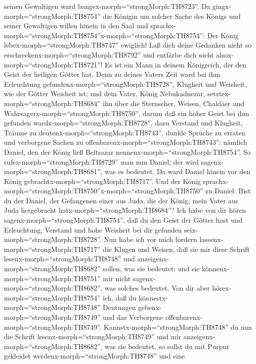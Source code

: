 seinen Gewaltigen ward bangex-morph=``strongMorph:TH8723''.
 Da gingx-morph=``strongMorph:TH8754'' die Königin um
solcher Sache des Königs und seiner Gewaltigen willen hinein in den Saal
und sprachx-morph=``strongMorph:TH8754''x-morph=``strongMorph:TH8754'':
Der König lebex-morph=``strongMorph:TH8747'' ewiglich! Laß dich deine
Gedanken nicht so erschreckenx-morph=``strongMorph:TH8792'' und entfärbe
dich nicht alsox-morph=``strongMorph:TH8721''!  Es ist ein
Mann in deinem Königreich, der den Geist der heiligen Götter hat. Denn
zu deines Vaters Zeit ward bei ihm Erleuchtung
gefundenx-morph=``strongMorph:TH8728'', Klugheit und Weisheit, wie der
Götter Weisheit ist; und dein Vater, König Nebukadnezar,
setztex-morph=``strongMorph:TH8684'' ihn über die Sternseher, Weisen,
Chaldäer und Wahrsagerx-morph=``strongMorph:TH8750'', 
darum daß ein hoher Geist bei ihm gefunden
wardx-morph=``strongMorph:TH8728'', dazu Verstand und Klugheit, Träume
zu deutenx-morph=``strongMorph:TH8743'', dunkle Sprüche zu erraten und
verborgene Sachen zu offenbarenx-morph=``strongMorph:TH8743'': nämlich
Daniel, den der König ließ Beltsazar
nennenx-morph=``strongMorph:TH8754''. So
rufex-morph=``strongMorph:TH8729'' man nun Daniel; der wird
sagenx-morph=``strongMorph:TH8681'', was es bedeutet.  Da
ward Daniel hinein vor den König gebrachtx-morph=``strongMorph:TH8717''.
Und der König
sprachx-morph=``strongMorph:TH8750''x-morph=``strongMorph:TH8750'' zu
Daniel: Bist du der Daniel, der Gefangenen einer aus Juda, die der
König, mein Vater aus Juda hergebracht
hatx-morph=``strongMorph:TH8684''?  Ich habe von dir hören
sagenx-morph=``strongMorph:TH8754'', daß du den Geist der Götter hast
und Erleuchtung, Verstand und hohe Weisheit bei dir gefunden
seix-morph=``strongMorph:TH8728''.  Nun habe ich vor mich
fordern lassenx-morph=``strongMorph:TH8717'' die Klugen und Weisen, daß
sie mir diese Schrift lesenx-morph=``strongMorph:TH8748'' und
anzeigenx-morph=``strongMorph:TH8682'' sollen, was sie bedeutet: und sie
könnenx-morph=``strongMorph:TH8751'' mir nicht
sagenx-morph=``strongMorph:TH8682'', was solches bedeutet. 
Von dir aber hörex-morph=``strongMorph:TH8754'' ich, daß du
könnestx-morph=``strongMorph:TH8748'' Deutungen
gebenx-morph=``strongMorph:TH8749'' und das Verborgene
offenbarenx-morph=``strongMorph:TH8749''.
Kannstx-morph=``strongMorph:TH8748'' du nun die Schrift
lesenx-morph=``strongMorph:TH8749'' und mir
anzeigenx-morph=``strongMorph:TH8682'', was sie bedeutet, so sollst du
mit Purpur gekleidet werdenx-morph=``strongMorph:TH8748'' und eine
